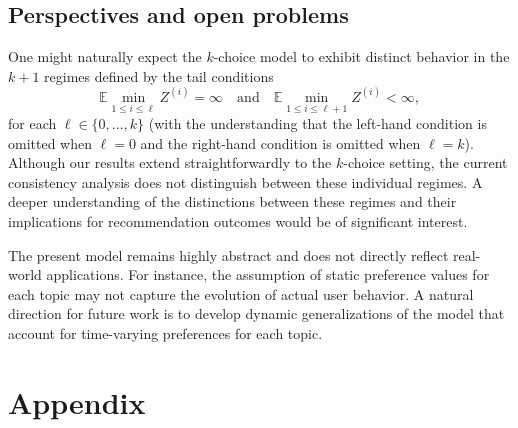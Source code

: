 \documentclass[12pt]{article}
\newcommand{\E}{\mathbb{E}}
\numberwithin{equation}{section} \font\titre=cmbx12
\begin{document}
\color{black}


\subsection{Perspectives and open problems}
\color{black}
One might naturally expect the $k$-choice model to exhibit distinct behavior in the $k+1$ regimes defined by the tail conditions
\[
\E \min_{1\le i \le \ell} Z^{(i)} = \infty \quad \text{and} \quad \E \min_{1\le i \le \ell+1} Z^{(i)} < \infty,
\]
for each $\ell \in \{0, \dots, k\}$ (with the understanding that the left-hand condition is omitted when $\ell = 0$ and the right-hand condition is omitted when $\ell = k$).  
Although our results extend straightforwardly to the $k$-choice setting, the current consistency analysis does not distinguish between these individual regimes. A deeper understanding of the distinctions between these regimes and their implications for recommendation outcomes would be of significant interest.

The present model remains highly abstract and does not directly reflect real-world applications. For instance, the assumption of static preference values for each topic may not capture the evolution of actual user behavior. A natural direction for future work is to develop dynamic generalizations of the model that account for time-varying preferences for each topic.

\color{black}


\newpage
\section*{Appendix}
\end{document}
